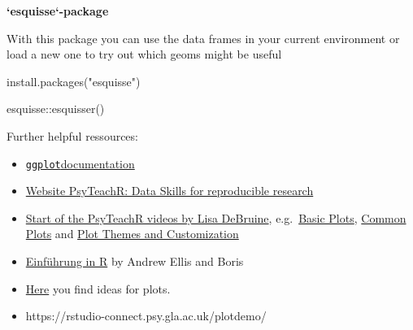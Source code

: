 \documentclass[
  letterpaper,
  DIV=11,
  numbers=noendperiod,
  oneside]{scrreprt}
\newenvironment{Shaded}{\begin{snugshade}}{\end{snugshade}}
\newcommand{\FunctionTok}[1]{\textcolor[rgb]{0.28,0.35,0.67}{#1}}
\newcommand{\NormalTok}[1]{\textcolor[rgb]{0.00,0.23,0.31}{#1}}
\newcommand{\SpecialCharTok}[1]{\textcolor[rgb]{0.37,0.37,0.37}{#1}}
\newcommand{\StringTok}[1]{\textcolor[rgb]{0.13,0.47,0.30}{#1}}
\begin{document}
\begin{tcolorbox}[enhanced jigsaw, leftrule=.75mm, colframe=quarto-callout-tip-color-frame, left=2mm, breakable, bottomrule=.15mm, rightrule=.15mm, colback=white, opacityback=0, arc=.35mm, toprule=.15mm]
\begin{minipage}[t]{5.5mm}
\textcolor{quarto-callout-tip-color}{\faLightbulb}
\end{minipage}%
\begin{minipage}[t]{\textwidth - 5.5mm}

\textbf{`esquisse`-package}\vspace{2mm}

With this package you can use the data frames in your current
environment or load a new one to try out which geoms might be useful

\begin{Shaded}
\begin{Highlighting}[]
\FunctionTok{install.packages}\NormalTok{(}\StringTok{"esquisse"}\NormalTok{)}

\NormalTok{esquisse}\SpecialCharTok{::}\FunctionTok{esquisser}\NormalTok{() }
\end{Highlighting}
\end{Shaded}

\end{minipage}%
\end{tcolorbox}

Further helpful ressources:

\begin{itemize}
\item
  \href{https://ggplot2.tidyverse.org/}{\texttt{ggplot}documentation}
\item
  \href{https://psyteachr.github.io/reprores-v3}{Website PsyTeachR: Data
  Skills for reproducible research}
\item
  \href{https://youtu.be/90IdULVGmYY}{Start of the PsyTeachR videos by
  Lisa DeBruine}, e.g.~\href{https://youtu.be/tOFQFPRgZ3M}{Basic Plots},
  \href{https://youtu.be/kKlQupjD__g}{Common Plots} and
  \href{https://youtu.be/6pHuCbOh86s}{Plot Themes and Customization}
\item
  \href{https://methodenlehre.github.io/einfuehrung-in-R/chapters/05-plotting.html}{Einführung
  in R} by Andrew Ellis and Boris
\item
  \href{https://www.data-to-viz.com}{Here} you find ideas for plots.
\item
  https://rstudio-connect.psy.gla.ac.uk/plotdemo/
\end{itemize}
\end{document}
